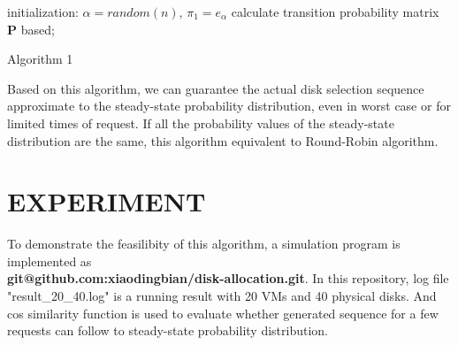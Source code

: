 \documentclass[11pt,a4paper]{article}
\begin{document}
\begin{algorithm}[H]
  initialization: $\alpha=random(n)$, $\pi_{1} = e_{\alpha}$\;
  calculate transition probability matrix $\mathbf{P}$ based;
\caption{Algorithm 1}
\label{alg:final}
\end{algorithm}

Based on this algorithm, we can guarantee the actual disk selection sequence 
approximate to the steady-state probability distribution, even in worst case or for limited times of request. If all the probability 
values of the steady-state distribution are the same, this algorithm 
equivalent to Round-Robin algorithm.

\section{\textbf\normalsize{EXPERIMENT}}
To demonstrate the feasilibity of this algorithm, a simulation program is implemented 
as\\
\textbf{git@github.com:xiaodingbian/disk-allocation.git}.
In this repository, log file "result\_20\_40.log" is a running result with 20 VMs and 40 physical disks.
And cos similarity function is used to evaluate whether generated sequence for a few requests can 
follow to steady-state probability distribution.
\end{document}
